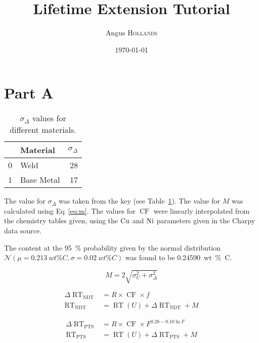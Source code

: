 \documentclass{article}
\title{Lifetime Extension Tutorial} %
\author{Angus \textsc{Hollands}} %
\date{\today} %
\newcommand\RT{\operatorname{RT}}
\begin{document}
\maketitle %


\begin{abstract}
  
\end{abstract}

\section{Part A}

    \begin{table}
    \caption{$\sigma_\Delta$ values for different materials.}
    \label{table:sigma_delta}
    \centering
    \begin{tabular}{llr}
    \toprule
    {} &    Material &  $\sigma_\Delta$ \\
    \midrule
    0 &        Weld &  28 \\
    1 &  Base Metal &  17 \\
    \bottomrule
    \end{tabular}
    \end{table}
    
    The value for $\sigma_\Delta$ was taken from the key (see Table~\ref{table:sigma_delta}). The value for $M$ was calculated using Eq~\ref{eq:m}.    
    The values for $\operatorname{CF}$ were linearly interpolated from the chemistry tables given, using the $\ce{Cu}$ and $\ce{Ni}$ parameters given in the Charpy data source.
    
    The  content at the \SI{95}{\percent} probability given by the normal distribution $\mathcal{N}(\mu=\SI{0.213}{wt\percent C}, \sigma=\SI{0.02}{wt\percent C})$ was found to be \SI{0.24590}{wt\percent C}.
    
    \begin{equation}
    \label{eq:m}
        M = 2\sqrt{\sigma_U^2+\sigma_\Delta^2}
    \end{equation}
    
    \begin{align}
    \label{eq:rt_ndt}
        \Delta{\RT}_{\operatorname{NDT}} &= R\times \operatorname{CF} \times f \\
        \RT_{\operatorname{NDT}} &= \RT(U) + \Delta\RT_{\operatorname{NDT}} + M
    \end{align}
    
    \begin{align}
    \label{eq:rt_pts}
        \Delta{\RT}_{\operatorname{PTS}} &= R\times \operatorname{CF} \times F^{0.28 - 0.10\ln{F}} \\
        \RT_{\operatorname{PTS}} &= \RT(U) + \Delta\RT_{\operatorname{PTS}} + M
    \end{align}
    
\end{document}
